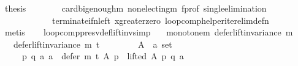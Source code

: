 \begin{isabellebody}
\ {\isacharquery}{\kern0pt}thesis\isanewline
\ \ \ \ \ \ \isamarkupfalse%
\ card{\isacharunderscore}{\kern0pt}big{\isacharunderscore}{\kern0pt}enough{\isacharunderscore}{\kern0pt}m\ non{\isacharunderscore}{\kern0pt}electing{\isacharunderscore}{\kern0pt}m\ f{\isacharunderscore}{\kern0pt}prof\ single{\isacharunderscore}{\kern0pt}elimination\isanewline
\ \ \ \ \ \ \ \ \ \ \ \ terminate{\isacharunderscore}{\kern0pt}if{\isacharunderscore}{\kern0pt}n{\isacharunderscore}{\kern0pt}left\ x{\isacharunderscore}{\kern0pt}greater{\isacharunderscore}{\kern0pt}zero\ loop{\isacharunderscore}{\kern0pt}comp{\isacharunderscore}{\kern0pt}helper{\isacharunderscore}{\kern0pt}iter{\isacharunderscore}{\kern0pt}elim{\isacharunderscore}{\kern0pt}def{\isacharunderscore}{\kern0pt}n\isanewline
\ \ \ \ \ \ \isamarkupfalse%
\ metis\isanewline
\ \ \isamarkupfalse%
\isanewline
{}\isamarkupfalse%
%
\endisatagproof
{\isafoldproof}%
%
\isadelimproof
%
\endisadelimproof
%
\isadelimdocument
%
\endisadelimdocument
%
\isatagdocument
%
\isamarkuptrue%
%
\endisatagdocument
{\isafolddocument}%
%
\isadelimdocument
%
\endisadelimdocument
{}\isamarkupfalse%
\ loop{\isacharunderscore}{\kern0pt}comp{\isacharunderscore}{\kern0pt}presv{\isacharunderscore}{\kern0pt}def{\isacharunderscore}{\kern0pt}lift{\isacharunderscore}{\kern0pt}inv{\isacharbrackleft}{\kern0pt}simp{\isacharbrackright}{\kern0pt}{\isacharcolon}{\kern0pt}\isanewline
\ \ \ monotone{\isacharunderscore}{\kern0pt}m{\isacharcolon}{\kern0pt}\ {\isachardoublequoteopen}defer{\isacharunderscore}{\kern0pt}lift{\isacharunderscore}{\kern0pt}invariance\ m{\isachardoublequoteclose}\isanewline
\ \ \ {\isachardoublequoteopen}defer{\isacharunderscore}{\kern0pt}lift{\isacharunderscore}{\kern0pt}invariance\ {\isacharparenleft}{\kern0pt}m\ {\isasymcirclearrowleft}\isactrlsub t{\isacharparenright}{\kern0pt}{\isachardoublequoteclose}\isanewline
%
\isadelimproof
%
\endisadelimproof
%
\isatagproof
{}\isamarkupfalse%
\ {\isacharminus}{\kern0pt}\isanewline
\ \ \isamarkupfalse%
\isanewline
\ \ \ \ A\ {\isacharcolon}{\kern0pt}{\isacharcolon}{\kern0pt}\ {\isachardoublequoteopen}{\isacharprime}{\kern0pt}a\ set{\isachardoublequoteclose}\isanewline
\ \ \isamarkupfalse%
\isanewline
\ \ \ \ {\isachardoublequoteopen}{\isasymforall}\ p\ q\ a{\isachardot}{\kern0pt}\ {\isacharparenleft}{\kern0pt}a\ {\isasymin}\ {\isacharparenleft}{\kern0pt}defer\ {\isacharparenleft}{\kern0pt}m\ {\isasymcirclearrowleft}\isactrlsub t{\isacharparenright}{\kern0pt}\ A\ p{\isacharparenright}{\kern0pt}\ {\isasymand}\ lifted\ A\ p\ q\ a{\isacharparenright}{\kern0pt}\ {\isasymlongrightarrow}\isanewline

\end{isabellebody}
